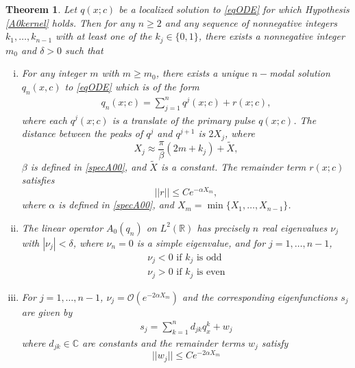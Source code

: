 \documentclass[12pt]{article}
\def\R{{\mathbb R}}
\def\C{{\mathbb C}}
\newtheorem{theorem}{Theorem}
\begin{document}
\begin{theorem}\label{multiexist}
Let $q(x; c)$ be a localized solution to \eqref{eqODE} for which Hypothesis \ref{A0kernel} holds. Then for any $n \geq 2$ and any sequence of nonnegative integers $k_1, \dots, k_{n-1}$ with at least one of the $k_j \in \{0, 1 \}$, there exists a nonnegative integer $m_0$ and $\delta > 0$ such that
\begin{enumerate}[(i)]
	\item For any integer $m$ with $m \geq m_0$, there exists a unique $n-$modal solution $q_n(x, c)$ to \eqref{eqODE} which is of the form
	\begin{align}\label{qn}
	q_n(x; c) = \sum_{j = 1}^{n} q^j(x; c) + r(x; c),
	\end{align}
	where each $q^j(x; c)$ is a translate of the primary pulse $q(x; c)$. The distance between the peaks of $q^j$ and $q^{j+1}$ is $2 X_j$, where
	\begin{equation*}
	X_j \approx \frac{\pi}{\beta}(2 m + k_j) + \tilde{X},
	\end{equation*}
	$\beta$ is defined in \eqref{specA00}, and $\tilde{X}$ is a constant. The remainder term $r(x; c)$ satisfies
	\begin{equation}\label{rbound}
	||r|| \leq C e^{-\alpha X_m},
	\end{equation}
	where $\alpha$ is defined in \eqref{specA00}, and $X_m = \min\{X_1, \dots, X_{n-1}\}$.

	\item The linear operator $A_0(q_n)$ on $L^2(\R)$ has precisely $n$ real eigenvalues $\nu_j$ with $|\nu_j| < \delta$, where $\nu_n = 0$ is a simple eigenvalue, and for $j = 1, \dots, n-1$,
	\begin{align*}
	\nu_j < 0 \text{ if } k_j \text{ is odd} \\
	\nu_j > 0 \text{ if } k_j \text{ is even} 
	\end{align*}

	\item For $j = 1, \dots, n-1$, $\nu_j = \mathcal{O}(e^{-2\alpha X_m})$ and the corresponding eigenfunctions $s_j$ are given by
	\begin{align}\label{sj}
	s_j = \sum_{k = 1}^{n} d_{jk} q^k_x + w_j
	\end{align}
	where $d_{jk} \in \C$ are constants and the remainder terms $w_j$ satisfy
	\begin{equation}\label{sjwbound}
	||w_j|| \leq C e^{-2 \alpha X_m}
	\end{equation}


\end{enumerate}
\end{theorem}
\end{document}
